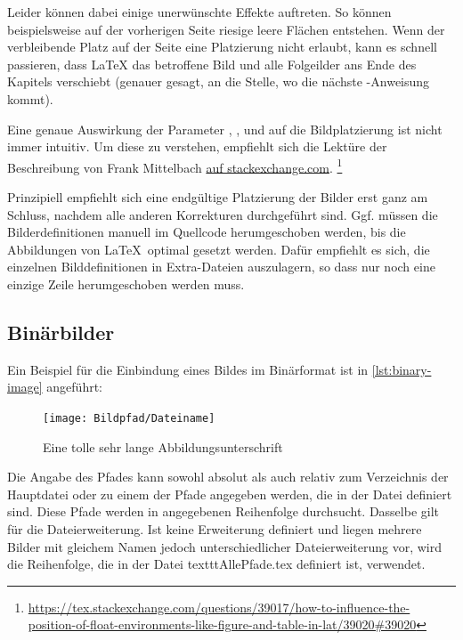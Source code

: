 Leider können dabei einige unerwünschte Effekte auftreten.
So können beispielsweise auf der vorherigen Seite riesige leere Flächen entstehen.
Wenn der verbleibende Platz auf der Seite eine Platzierung nicht erlaubt,
kann es schnell passieren, dass \LaTeX{} das betroffene Bild 
und alle Folgeilder ans Ende des Kapitels verschiebt
(genauer gesagt, an die Stelle, wo die nächste -Anweisung kommt).

Eine genaue Auswirkung der Parameter
, ,  und 
auf die Bildplatzierung ist nicht immer intuitiv.
Um diese zu verstehen, empfiehlt sich die Lektüre der Beschreibung
von Frank Mittelbach
\href{https://tex.stackexchange.com/questions/39017/how-to-influence-the-position-of-float-environments-like-figure-and-table-in-lat/39020#39020}{auf stackexchange.com}.%
\footnote{\url{https://tex.stackexchange.com/questions/39017/how-to-influence-the-position-of-float-environments-like-figure-and-table-in-lat/39020#39020}}

Prinzipiell empfiehlt sich eine endgültige Platzierung der Bilder erst ganz am Schluss,
nachdem alle anderen Korrekturen durchgeführt sind.
Ggf. müssen die Bilderdefinitionen manuell im Quellcode herumgeschoben werden,
bis die Abbildungen von \LaTeX\ optimal gesetzt werden.
Dafür empfiehlt es sich, die einzelnen Bilddefinitionen in Extra-Dateien auszulagern,
so dass nur noch eine einzige Zeile herumgeschoben werden muss.

\subsection[Binärbilder]{Binärbilder}%
\label{sec:Binaerbilder}
%
Ein Beispiel für die Einbindung eines Bildes im Binärformat ist in \cref{lst:binary-image} angeführt:

\begin{latex}[caption={Einbindung einer Binärgrafik in LaTeX},label={lst:binary-image}]
\begin{figure}[h]%
  \centering%
  \texttt{[image: Bildpfad/Dateiname]}%
  \caption[Kurzversion für das Abbildungsverzeichnis]{%
           Eine tolle sehr lange Abbildungsunterschrift}%
  \label{fig:my-binary-image}%
\end{figure}
\end{latex}

Die Angabe des Pfades kann sowohl absolut als auch relativ
zum Verzeichnis der Hauptdatei oder zu einem der Pfade angegeben werden,
die in der Datei  definiert sind.
Diese Pfade werden in angegebenen Reihenfolge durchsucht.
Dasselbe gilt für die Dateierweiterung.
Ist keine Erweiterung definiert und liegen mehrere Bilder mit gleichem Namen jedoch unterschiedlicher Dateierweiterung vor,
wird die Reihenfolge, die in der Datei texttt{AllePfade.tex} definiert ist, verwendet.

